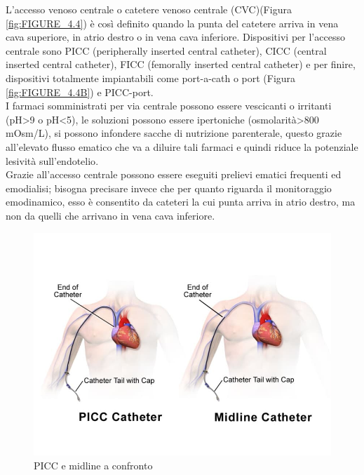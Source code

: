 L'accesso venoso centrale o catetere venoso centrale (CVC)(Figura \ref{fig:FIGURE_4.4}) è così definito quando la punta 
del catetere arriva in 
vena cava superiore, in atrio destro o in vena cava inferiore. Dispositivi per l'accesso centrale sono PICC 
(peripherally inserted central catheter), CICC (central inserted central catheter), 
FICC (femorally inserted central catheter) e per finire, 
dispositivi totalmente impiantabili come port-a-cath o port (Figura \ref{fig:FIGURE_4.4B}) e PICC-port\cite{GAVECELTracc2021}.\\
I farmaci somministrati per via centrale possono essere vescicanti o irritanti (pH>9 o pH<5), le soluzioni possono essere 
ipertoniche (osmolarità>800 mOsm/L), si possono infondere sacche di nutrizione parenterale\cite{LINEEGUIDA},
questo grazie all'elevato flusso ematico che va a diluire tali farmaci e quindi riduce 
la potenziale lesività sull'endotelio\cite{GAVECELTracc2021}.\\
Grazie all'accesso centrale possono essere eseguiti prelievi ematici frequenti ed emodialisi; bisogna precisare 
invece che per quanto riguarda il monitoraggio emodinamico, esso è consentito da cateteri 
la cui punta arriva in atrio destro, ma non da quelli che arrivano in vena cava inferiore\cite{GAVECELTracc2021}.

\begin{figure}[H]
    \begin{center}
    \includegraphics[width=0.5\columnwidth]{img/picc.jpeg}
    \vspace{-3mm}
    \end{center}
    \caption{PICC e midline a confronto
    \cite{img40}}
    \label{fig:FIGURE_4.3}
\end{figure}

